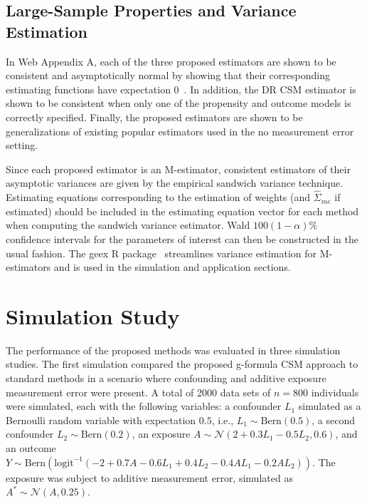 \documentclass[useAMS,usenatbib,referee]{biom}
\begin{document}
\subsection{Large-Sample Properties and Variance Estimation}

In Web Appendix A, each of the three proposed estimators are shown to be consistent and asymptotically normal by showing that their corresponding estimating functions have expectation 0~\citep{stefanski2002}. In addition, the DR CSM estimator is shown to be consistent when only one of the propensity and outcome models is correctly specified. Finally, the proposed estimators are shown to be generalizations of existing popular estimators used in the no measurement error setting.

Since each proposed estimator is an M-estimator, consistent estimators of their asymptotic variances are given by the empirical sandwich variance technique. Estimating equations corresponding to the estimation of weights (and $\hat{\Sigma}_{me}$ if estimated) should be included in the estimating equation vector for each method when computing the sandwich variance estimator. Wald $100(1-\alpha)\%$ confidence intervals for the parameters of interest can then be constructed in the usual fashion. The geex R package~\citep{saul2017} streamlines variance estimation for M-estimators and is used in the simulation and application sections.

\section{Simulation Study}

The performance of the proposed methods was evaluated in three simulation studies. The first simulation compared the proposed g-formula CSM approach to standard methods in a scenario where confounding and additive exposure measurement error were present. A total of 2000 data sets of $n = 800$ individuals were simulated, each with the following variables: a confounder $L_{1}$ simulated as a Bernoulli random variable with expectation $0.5$, i.e., $L_{1} \sim \text{Bern}(0.5)$, a second confounder $L_{2} \sim \text{Bern}(0.2)$, an exposure $A \sim \mathcal{N}(2 + 0.3L_{1} - 0.5L_{2}, 0.6)$, and an outcome $Y \sim \text{Bern}(\text{logit}^{-1}(-2 + 0.7A - 0.6L_{1} + 0.4L_{2} - 0.4AL_{1} - 0.2AL_{2}))$. The exposure was subject to additive measurement error, simulated as $A^{*} \sim \mathcal{N}(A, 0.25)$.
\end{document}
